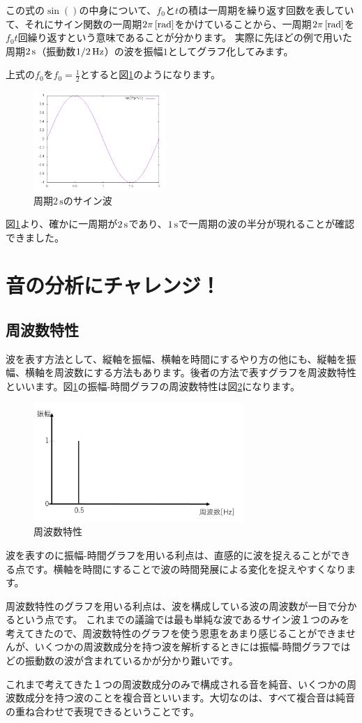 \documentclass[11pt,b5paper,papersize,dvipdfmx]{jsbook}
\begin{document}
この式の$\sin{()}$の中身について、$f_0$と$t$の積は一周期を繰り返す回数を表していて、それにサイン関数の一周期$2\pi \tani*{rad}$をかけていることから、一周期$2\pi \tani*{rad}$を$f_0 t$回繰り返すという意味であることが分かります。
実際に先ほどの例で用いた周期$2\tani{s}$（振動数$1/2\tani{Hz}$）の波を振幅$1$としてグラフ化してみます。\par
上式の$f_0$を$f_0=\frac{1}{2}$とすると図\ref{fig:sintwo}のようになります。
\begin{figure}[H]
  \centering
  \includegraphics[width=5cm]{nsmr/img/sin05.png}
  \caption{周期$2\,\mathrm{s}$のサイン波}
  \label{fig:sintwo}
\end{figure}
図\ref{fig:sintwo}より、確かに一周期が$2\tani{s}$であり、$1\tani{s}$で一周期の波の半分が現れることが確認できました。
%
\newpage
\section{音の分析にチャレンジ！}
\subsection{周波数特性}
波を表す方法として、縦軸を振幅、横軸を時間にするやり方の他にも、縦軸を振幅、横軸を周波数にする方法もあります。後者の方法で表すグラフを周波数特性といいます。図\ref{fig:sintwo}の振幅-時間グラフの周波数特性は図\ref{fig:shuuhasuutoku}になります。
\begin{figure}[H]
  \centering
  \includegraphics[width=8cm]{nsmr/img/slide17.PNG}
  \caption{周波数特性}
  \label{fig:shuuhasuutoku}
\end{figure}
波を表すのに振幅-時間グラフを用いる利点は、直感的に波を捉えることができる点です。横軸を時間にすることで波の時間発展による変化を捉えやすくなります。\par
周波数特性のグラフを用いる利点は、波を構成している波の周波数が一目で分かるという点です。
これまでの議論では最も単純な波であるサイン波１つのみを考えてきたので、周波数特性のグラフを使う恩恵をあまり感じることができませんが、いくつかの周波数成分を持つ波を解析するときには振幅-時間グラフではどの振動数の波が含まれているかが分かり難いです。\par
これまで考えてきた１つの周波数成分のみで構成される音を純音、いくつかの周波数成分を持つ波のことを複合音といいます。大切なのは、すべて複合音は純音の重ね合わせで表現できるということです。
\end{document}
